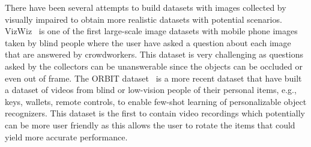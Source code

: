 There have been several attempts to build datasets with images collected by visually impaired to obtain more realistic datasets with potential scenarios. VizWiz~\cite{gurari2018vizwiz} is one of the first large-scale image datasets with mobile phone images taken by blind people where the user have asked a question about each image that are answered by crowdworkers. This dataset is very challenging as questions asked by the collectors can be unanswerable since the objects can be occluded or even out of frame. The ORBIT dataset~\cite{massiceti2021orbit} is a more recent dataset that have built a dataset of videos from blind or low-vision people of their personal items, e.g., keys, wallets, remote controls, to enable few-shot learning of personalizable object recognizers. This dataset is the first to contain video recordings which potentially can be more user friendly as this allows the user to rotate the items that could yield more accurate performance. 
